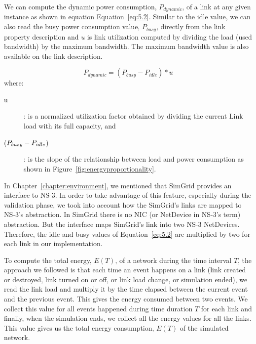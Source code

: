 We can compute the dynamic power consumption, \(P_{dynamic}\), of a link at any given instance as shown in equation Equation~\ref{eq:5.2}. Similar to the idle value, we can also read the busy power consumption value, \(P_{busy}\), directly from the 
link property description and $u$ is link utilization computed by dividing the load (used bandwidth) by the maximum bandwidth. The maximum bandwidth value is also available on the link description. 

\begin{equation} \label{eq:5.2}
P_{dynamic} = (P_{busy} - P_{idle}) * u 
\end{equation} 
where:
\begin{description}
	\item [u]: is a normalized utilization factor obtained by dividing the current Link load with its full capacity, and 
	\item [(\($$P_{busy} - P_{idle}$$\))]: is the slope of the relationship between load and power consumption as shown in Figure~\ref{fig:energyproportionality}.
\end{description} 

In Chapter~\ref{chapter:environment}, we mentioned that SimGrid provides an interface to NS-3. In order to take advantage of this feature, especially during the validation phase, we took into account how the SimGrid's links are mapped to NS-3's abstraction. In SimGrid there is no NIC (or NetDevice in NS-3's term) abstraction. But the interface maps SimGrid's link into two NS-3 NetDevices. Therefore, the idle and busy values of Equation~\ref{eq:5.2} are multiplied by two  for each link in our implementation.

To compute the total energy, \(E(T)\), of a network during the time interval $T$, the approach we followed is that each time an event happens on a link (link created or destroyed, link turned on or off, or link load change, or simulation ended), we read the link load and multiply it by the time elapsed between the current event and the previous event. This gives the energy consumed between two events. We collect this value for all events happened during time duration $T$ for each link and finally, when the simulation ends, we collect all the energy values for all the links. This value gives us the total energy consumption, \(E(T)\) of the simulated network.

